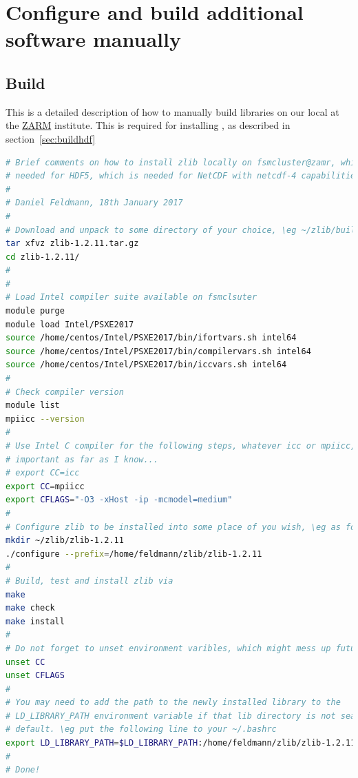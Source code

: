 \documentclass[a4paper, 11pt, DIV=11]{scrartcl}
\begin{document}
 
















\section{Configure and build additional software manually}
\label{app:selfBuildLibraries}

\subsection{Build }
\label{sec:buildzlib}

This is a detailed description of how to manually build 
libraries on our local  at the
\href{https://www.zarm.uni-bremen.de/en/}{ZARM} institute. This is required
for installing \hdf, as described in section~\ref{sec:buildhdf}

\begin{lstlisting}[language=bash]
# Brief comments on how to install zlib locally on fsmcluster@zamr, which is
# needed for HDF5, which is needed for NetCDF with netcdf-4 capabilities.
#
# Daniel Feldmann, 18th January 2017
# 
# Download and unpack to some directory of your choice, \eg ~/zlib/build
tar xfvz zlib-1.2.11.tar.gz
cd zlib-1.2.11/
#
#
# Load Intel compiler suite available on fsmclsuter
module purge
module load Intel/PSXE2017
source /home/centos/Intel/PSXE2017/bin/ifortvars.sh intel64
source /home/centos/Intel/PSXE2017/bin/compilervars.sh intel64
source /home/centos/Intel/PSXE2017/bin/iccvars.sh intel64
#
# Check compiler version
module list
mpiicc --version
#
# Use Intel C compiler for the following steps, whatever icc or mpiicc, is not
# important as far as I know...
# export CC=icc
export CC=mpiicc
export CFLAGS="-O3 -xHost -ip -mcmodel=medium"
#
# Configure zlib to be installed into some place of you wish, \eg as follows 
mkdir ~/zlib/zlib-1.2.11
./configure --prefix=/home/feldmann/zlib/zlib-1.2.11 
#
# Build, test and install zlib via
make
make check
make install
#
# Do not forget to unset environment varibles, which might mess up future builds
unset CC
unset CFLAGS
#
# You may need to add the path to the newly installed library to the
# LD_LIBRARY_PATH environment variable if that lib directory is not searched by
# default. \eg put the following line to your ~/.bashrc
export LD_LIBRARY_PATH=$LD_LIBRARY_PATH:/home/feldmann/zlib/zlib-1.2.11/lib
# 
# Done!
\end{lstlisting}
\end{document}
